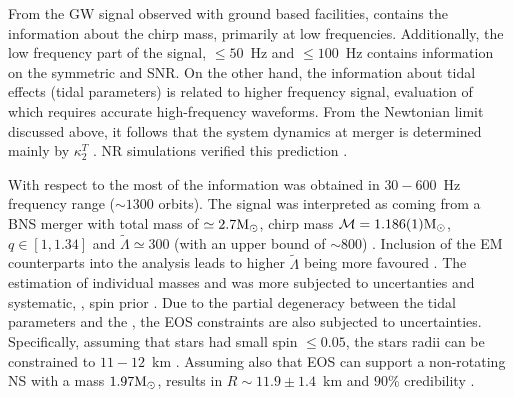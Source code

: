 From the \ac{GW} signal observed with ground based facilities, contains the information 
about the chirp mass, 
primarily at low frequencies. Additionally, the low frequency part of the signal, 
$\leq50$~Hz and $\leq100$~Hz contains information on the symmetric \mr{} and \ac{SNR}.
On the other hand, the information about tidal effects (tidal parameters) is related to 
higher frequency signal, evaluation of which requires accurate high-frequency waveforms.
%
From the Newtonian limit discussed above, it follows that the system dynamics at merger 
is determined mainly by $\kappa_2^T$ \cite{44}. \ac{NR} simulations verified this 
prediction \cite{60,55}. 

With respect to the \GW{} most of the information was obtained in $30-600$~Hz frequency 
range ($\sim 1300$ orbits).
The signal was interpreted as coming from a \ac{BNS} merger with total mass of $\simeq2.7{\text{M}_{\odot}}$,
chirp mass $\mathcal{M}=1.186(1){\text{M}_{\odot}}$, \mr{} $q\in[1,1.34]$ and $\tilde{\Lambda}\simeq 300$ 
(with an upper bound of $\sim800$) \cite{1,2,61}.
Inclusion of the \ac{EM} counterparts into the analysis leads to higher $\tilde{\Lambda}$ being 
more favoured \cite{62,63}.
%
The estimation of individual masses and \mr{} was more subjected to uncertanties and 
systematic, \ie, spin prior \cite{2}. Due to the partial degeneracy between the tidal 
parameters and the \mr{}, the \ac{EOS} constraints are also subjected to uncertainties. 
Specifically, assuming that stars had small spin $\leq 0.05$, the stars radii can be 
constrained to $11-12$~km \cite{64,65}. 
Assuming also that \ac{EOS} can support a non-rotating \ac{NS} with a mass $1.97{\text{M}_{\odot}}$, 
results in  $R\sim 11.9\pm 1.4$~km and $90\%$ credibility \cite{65}.
%
%


